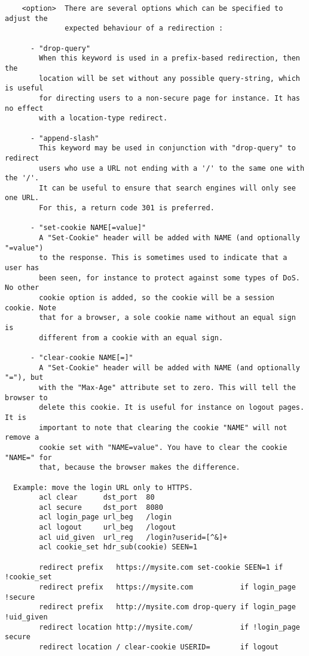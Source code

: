 \begin{verbatim}
    <option>  There are several options which can be specified to adjust the
              expected behaviour of a redirection :

      - "drop-query"
        When this keyword is used in a prefix-based redirection, then the
        location will be set without any possible query-string, which is useful
        for directing users to a non-secure page for instance. It has no effect
        with a location-type redirect.

      - "append-slash"
        This keyword may be used in conjunction with "drop-query" to redirect
        users who use a URL not ending with a '/' to the same one with the '/'.
        It can be useful to ensure that search engines will only see one URL.
        For this, a return code 301 is preferred.

      - "set-cookie NAME[=value]"
        A "Set-Cookie" header will be added with NAME (and optionally "=value")
        to the response. This is sometimes used to indicate that a user has
        been seen, for instance to protect against some types of DoS. No other
        cookie option is added, so the cookie will be a session cookie. Note
        that for a browser, a sole cookie name without an equal sign is
        different from a cookie with an equal sign.

      - "clear-cookie NAME[=]"
        A "Set-Cookie" header will be added with NAME (and optionally "="), but
        with the "Max-Age" attribute set to zero. This will tell the browser to
        delete this cookie. It is useful for instance on logout pages. It is
        important to note that clearing the cookie "NAME" will not remove a
        cookie set with "NAME=value". You have to clear the cookie "NAME=" for
        that, because the browser makes the difference.

  Example: move the login URL only to HTTPS.
        acl clear      dst_port  80
        acl secure     dst_port  8080
        acl login_page url_beg   /login
        acl logout     url_beg   /logout
        acl uid_given  url_reg   /login?userid=[^&]+
        acl cookie_set hdr_sub(cookie) SEEN=1

        redirect prefix   https://mysite.com set-cookie SEEN=1 if !cookie_set
        redirect prefix   https://mysite.com           if login_page !secure
        redirect prefix   http://mysite.com drop-query if login_page !uid_given
        redirect location http://mysite.com/           if !login_page secure
        redirect location / clear-cookie USERID=       if logout


\end{verbatim}
